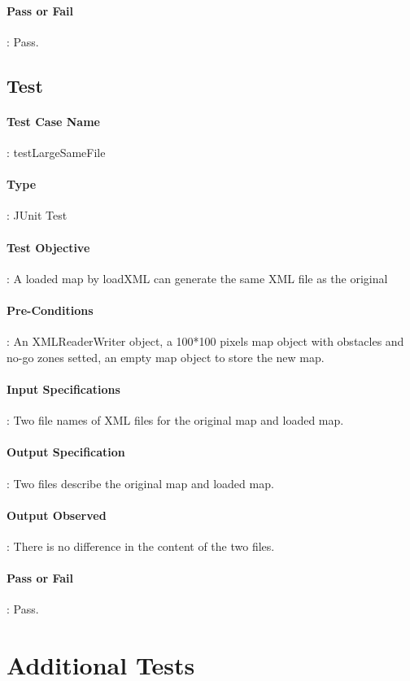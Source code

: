 \documentclass[12pt, a4paper]{report}
\begin{document}
\paragraph{Pass or Fail}: Pass.
\pagebreak

\addtocounter{casecounter}{1}
\subsection{Test }
\paragraph{Test Case Name}: testLargeSameFile
\paragraph{Type}: JUnit Test
\paragraph{Test Objective}: A loaded map by loadXML can generate the same XML file as the original
\paragraph{Pre-Conditions}: An XMLReaderWriter object, a 100*100 pixels map object with obstacles and no-go zones setted, an empty map object to store the new map.
\paragraph{Input Specifications}: Two file names of XML files for the original map and loaded map.
\paragraph{Output Specification}: Two files describe the original map and loaded map.
\paragraph{Output Observed}: There is no difference in the content of the two files.
\paragraph{Pass or Fail}: Pass.
\pagebreak


\section{Additional Tests}
\addtocounter{casecounter}{1}
\end{document}
